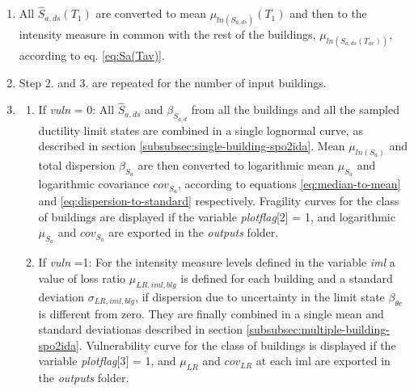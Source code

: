 \begin{enumerate}
\begin{itemize}
\end{itemize}

\item All $\hat{S}_{a, ds}(T_1)$ are converted to mean $\mu_{ln(S_{a, ds})}(T_1)$ and then to the intensity measure in common with the rest of the buildings, $\mu_{ln(S_{a, ds}(T_{av}))}$, according to eq. \ref{eq:Sa(Tav)}.

\item Step 2. and 3. are repeated for the number of input buildings.

\item
\begin{enumerate}

\item If \textit{vuln} = 0: All $\hat{S}_{a,ds}$ and $\beta_{S_{a, d}}$ from all the buildings and all the sampled ductility limit states are combined in a single lognormal curve, as described in section \ref{subsubsec:single-building-spo2ida}. 
Mean $\mu_{ln(S_{a})}$ and total dispersion $\beta_{S_a}$ are then converted to logarithmic mean $\mu_{S_a}$ and logarithmic covariance $cov_{S_a}$, according to equations \ref{eq:median-to-mean} and \ref{eq:dispersion-to-standard} respectively.
Fragility curves for the class of buildings are displayed if the variable \textit{plotflag}[2] = 1, and logarithmic $\mu_{S_a}$ and $cov_{S_a}$ are exported in the \textit{outputs} folder.
\item If \textit{vuln} =1:  
For the intensity measure levels defined in the variable \textit{iml} a value of loss ratio $\mu_{LR, iml, blg}$ is defined for each building and a standard deviation $\sigma_{LR, iml, blg}$, if dispersion due to uncertainty in the limit state $\beta_{\theta c}$ is different from zero. They are finally combined in a single mean and standard deviationas described in section \ref{subsubsec:multiple-building-spo2ida}. Vulnerability curve for the class of buildings is displayed if the variable \textit{plotflag}[3] = 1, and $\mu_{LR}$ and $cov_{LR}$ at each iml are exported in the \textit{outputs} folder.
\end{enumerate}

\end{enumerate}